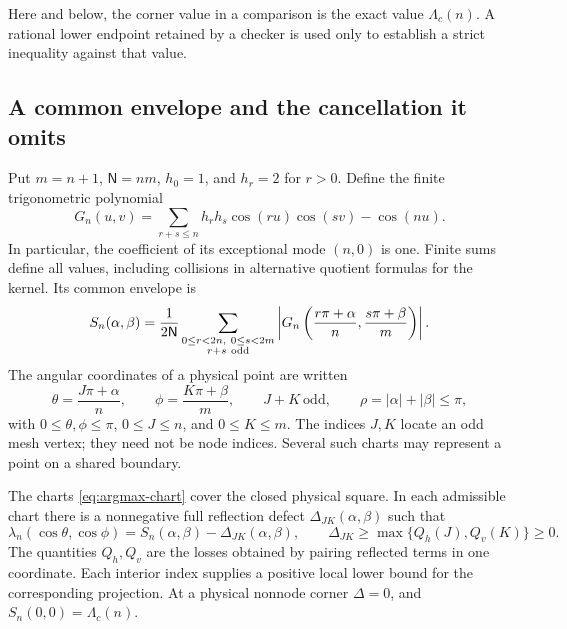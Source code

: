 Here and below, the corner value in a comparison is the exact value
$\Lambda_c(n)$.  A rational lower endpoint retained by a checker is used
only to establish a strict inequality against that value.

\subsection{A common envelope and the cancellation it omits}

Put $m=n+1$, $\mathsf N=nm$, $h_0=1$, and $h_r=2$ for $r>0$.  Define the
finite trigonometric polynomial
\begin{equation}
 G_n(u,v)=\sum_{r+s\leq n}h_rh_s\cos(ru)\cos(sv)-\cos(nu).
                                                        \label{eq:argmax-kernel}
\end{equation}
In particular, the coefficient of its exceptional mode $(n,0)$ is one.
Finite sums define all values, including collisions in alternative
quotient formulas for the kernel.  Its common envelope is
\begin{equation}
 S_n(\alpha,\beta)=\frac1{2\mathsf N}
 \sum_{\substack{0\leq r<2n,\ 0\leq s<2m\\r+s\ {\rm odd}}}
 \left|G_n\left(\frac{r\pi+\alpha}{n},
                    \frac{s\pi+\beta}{m}\right)\right|.
                                                        \label{eq:argmax-primitive}
\end{equation}
The angular coordinates of a physical point are written
\begin{equation}
 \theta=\frac{J\pi+\alpha}{n},\qquad
 \phi=\frac{K\pi+\beta}{m},\qquad
 J+K\ \text{odd},\qquad \rho=|\alpha|+|\beta|\leq\pi,
                                                        \label{eq:argmax-chart}
\end{equation}
with $0\leq\theta,\phi\leq\pi$, $0\leq J\leq n$, and $0\leq K\leq m$.
The indices $J,K$ locate an odd mesh vertex; they need not be node
indices.  Several such charts may represent a point on a shared boundary.

\begin{lemma}
\label{lem:argmax-physical-cover}
The charts \eqref{eq:argmax-chart} cover the closed physical square.  In
each admissible chart there is a nonnegative full reflection defect
$\Delta_{JK}(\alpha,\beta)$ such that
\begin{equation}
 \lambda_n(\cos\theta,\cos\phi)
       =S_n(\alpha,\beta)-\Delta_{JK}(\alpha,\beta),
 \qquad \Delta_{JK}\geq\max\{Q_h(J),Q_v(K)\}\geq0.
                                                        \label{eq:argmax-defect}
\end{equation}
The quantities $Q_h,Q_v$ are the losses obtained by pairing reflected
terms in one coordinate.  Each interior index supplies a positive local
lower bound for the corresponding projection.  At a physical nonnode
corner $\Delta=0$, and $S_n(0,0)=\Lambda_c(n)$.
\end{lemma}

